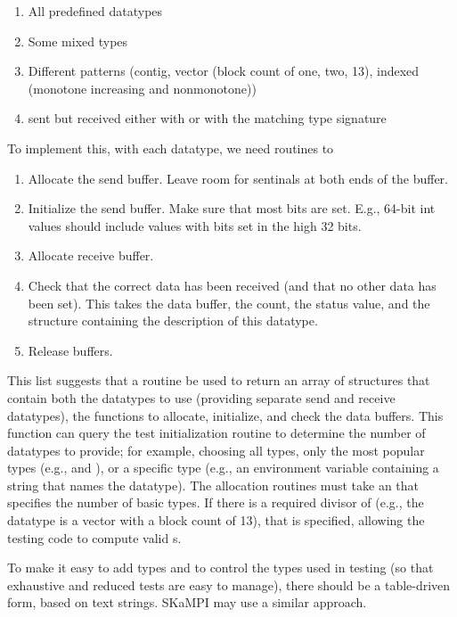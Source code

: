 \documentclass{article}
\begin{document}
\begin{enumerate}
     \begin{enumerate}
     \item All predefined datatypes
     \item Some mixed types
     \item Different patterns (contig, vector (block count of one,
           two, 13), indexed (monotone
           increasing and nonmonotone)) 
     \item {} sent but received either with
            or with the matching type signature
     \end{enumerate}
     To implement this, with each datatype, we need routines to
     \begin{enumerate}
     \item Allocate the send buffer.  Leave room for sentinals at both
     ends of the buffer.
     \item Initialize the send buffer.  Make sure that most bits are
           set.  E.g., 64-bit int values should include values with
           bits set in the high 32 bits.
     \item Allocate receive buffer.
     \item Check that the correct data has been received (and that no
           other data has been set).  This takes the data buffer, the
           count, the status value, and the structure containing the
           description of this datatype.
     \item Release buffers.
     \end{enumerate}
     This list suggests that a routine be used to return an array of
     structures that contain both the datatypes to use (providing
     separate send and receive datatypes), the functions to allocate,
     initialize, and check the data buffers.  This function can query
     the test initialization routine to determine the number of
     datatypes to provide; for example, choosing all types, only the
     most popular types (e.g.,  and ),
     or a specific type (e.g., an environment variable containing a
     string that names the datatype).  The allocation routines must
     take an  that specifies the number of basic
     types.  If there is a required divisor of  (e.g., the
     datatype is a vector with a block count of 13), that is
     specified, allowing the testing code to compute valid
     s.

     To make it easy to add types and to control the types used in
     testing (so that exhaustive and reduced tests are easy to
     manage), there should be a table-driven form, based on text
     strings.  SKaMPI may use a similar approach.


\end{enumerate}
\end{document}
